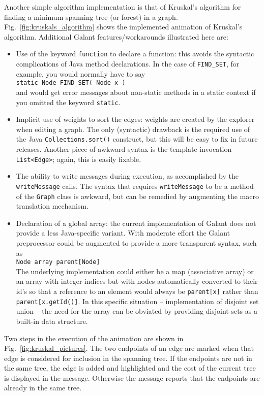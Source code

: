 



Another simple algorithm implementation is that of Kruskal's algorithm
for finding a minimum spanning tree (or forest) in a graph.
Fig.~\ref{fig:kruskals_algorithm}
shows the implemented animation of Kruskal's algorithm.
Additional Galant features/workarounds illustrated here are:
\begin{itemize}

\item
Use of the keyword \verb+function+ to declare a function: this avoids the
syntactic complications of Java method declarations. In the case of
\verb+FIND_SET+, for example, you would normally have to say\\
\verb+static Node FIND_SET( Node x )+\\
and would get error messages about non-static methods in a static context
if you omitted the keyword \verb+static+.

\item
Implicit use of weights to sort the edges: weights are created by the
explorer when editing a graph. The only (syntactic) drawback is the required
use of the Java \verb+Collections.sort()+ construct, but this will be easy to fix in future releases.
Another piece of awkward syntax is the template invocation
\verb+List<Edge>+; again, this is easily fixable.

\item
The ability to write messages during execution, as accomplished by the
\verb+writeMessage+ calls.
The syntax that requires \verb+writeMessage+ to be a method of the \verb+Graph+
class is awkward, but can be remedied by augmenting the macro translation
mechanism.

\item
Declaration of a global array: the current implementation of Galant does
not provide a less Java-specific variant.
With moderate effort the Galant preprocessor could be augmented to provide
a more transparent syntax, such as\\
\verb+Node array parent[Node]+\\
The underlying implementation could either be a map (associative array) or an
array with integer indices but with nodes automatically converted to their
id's so that a reference to an element would always be \verb+parent[x]+
rather than \verb+parent[x.getId()]+.
In this specific situation -- implementation of disjoint set union --
the need for the array can be obviated by providing disjoint sets as
a built-in data structure.

\end{itemize}

Two steps in the execution of the animation are shown
in Fig.~\ref{fig:kruskal_pictures}.
The two endpoints of an edge are marked when that edge is considered
for inclusion in the spanning tree.
If the endpoints are not in the same tree, the edge is added and highlighted
and the cost of the current tree is displayed in the message.
Otherwise the message reports that the endpoints are already in the same tree. 
